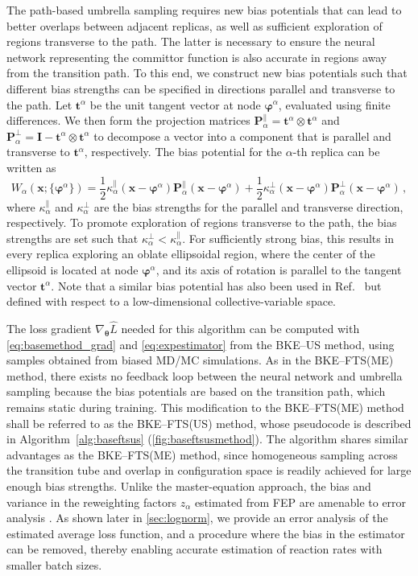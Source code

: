 \documentclass{article}
\numberwithin{equation}{section}
\def\*#1{\mathbf{#1}}
\theoremstyle{definition}
\theoremstyle{remark}
\def\thetab{\boldsymbol{\theta}}
\def\varphib{\boldsymbol{\varphi}}
\begin{document}
The path-based umbrella sampling requires new bias potentials that can lead to better overlaps between adjacent replicas, as well as sufficient exploration of regions transverse to the path. The latter is necessary to ensure the neural network representing the committor function is also accurate in regions away from the transition path. To this end, we construct new bias potentials such that different bias strengths can be specified in directions parallel and transverse to the path. Let $\* t^\alpha$ be the unit tangent vector at node $\varphib^\alpha$, evaluated using finite differences. We then form the projection matrices $\* P_\alpha^\parallel = \* t^\alpha \otimes \* t^\alpha$ and $\* P_\alpha^\bot = \* I-\* t^\alpha \otimes \* t^\alpha$ to decompose a vector into a component that is parallel and transverse to $\* t^\alpha$, respectively. The bias potential for the $\alpha$-th replica can be written as 
\begin{equation}
W_\alpha(\* x; \{ \varphib^\alpha \}) = \frac{1}{2}\kappa_\alpha^\parallel (\* x-\varphib^\alpha)\* P_\alpha^\parallel (\* x-\varphib^\alpha)+\frac{1}{2}\kappa_\alpha^\bot (\* x-\varphib^\alpha)\* P_\alpha^\bot(\* x-\varphib^\alpha)\,,
\label{eq:umbrella-fts}
\end{equation}
where $\kappa_\alpha^\parallel$ and $\kappa_\alpha^\bot$ are the bias strengths for the parallel and transverse direction, respectively. To promote exploration of regions transverse to the path, the bias strengths are set such that $\kappa_\alpha^\bot< \kappa_\alpha^\parallel$. For sufficiently strong bias, this results in every replica exploring an oblate ellipsoidal region, where the center of the ellipsoid is located at node $\varphib^\alpha$, and its axis of rotation is parallel to the tangent vector $\* t^\alpha$. Note that a similar bias potential has also been used in Ref.~\cite{zinovjev2017} but defined with respect to a low-dimensional collective-variable space.

The loss gradient  $\nabla_{\thetab} \hat{L}$ needed for this algorithm can be computed with  \cref{eq:basemethod_grad} and \cref{eq:expestimator} from the BKE--US method, using samples obtained from biased MD/MC simulations. As in the BKE--FTS(ME) method, there exists no feedback loop between the neural network and umbrella sampling because the bias potentials are based on the transition path, which remains static during training. This modification to the BKE--FTS(ME) method shall be referred to as the BKE--FTS(US) method, whose pseudocode is described in Algorithm~\ref{alg:baseftsus} (\cref{fig:baseftsusmethod}). The algorithm shares similar advantages as the BKE--FTS(ME) method, since homogeneous sampling across the transition tube and overlap in configuration space is readily achieved for large enough bias strengths. Unlike the master-equation approach, the bias and variance in the reweighting factors $z_\alpha$ estimated from FEP are amenable to error analysis \citep{shirts2005comparison}. As shown later in \cref{sec:lognorm}, we provide an error analysis of the estimated average loss function, and a procedure where the bias in the estimator can be removed, thereby enabling accurate estimation of reaction rates with smaller batch sizes. 
\end{document}
